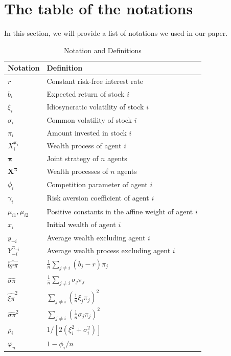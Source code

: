 \documentclass[11pt]{article}
\newenvironment{bluepar}
{\begingroup\color{blue}}
{\endgroup}
\numberwithin{equation}{section}
\renewcommand{\theequation}{\arabic{section}.\arabic{equation}}
\providecommand{\smn}{{-}} %
\begin{document}
\begin{bluepar}
\section{The table of the notations}\label{App:G}
\setcounter{equation}{0}
\renewcommand{\theequation}{G.\arabic{equation}}
In this section, we will provide a list of notations we used in our paper.
\begin{table}[htbp]
	\centering
	\caption{Notation and Definitions}
	\begin{tabular}{l l}
		\toprule
		\textbf{Notation} & \textbf{Definition} \\
		\midrule
		$r$ & Constant risk-free interest rate \\
		$b_i$ & Expected return of stock $i$ \\
		$\xi_i$ & Idiosyncratic volatility of stock $i$ \\
		$\sigma_i$ & Common volatility of stock $i$ \\
		$\pi_i$ & Amount invested in stock $i$ \\
		$X_i^{\bm{\pi}_i}$ & Wealth process of agent $i$ \\
		$\bm{\pi}$ & Joint strategy of $n$ agents \\
		$\bm{X}^{\bm{\pi}}$ & Wealth processes of $n$ agents \\
		$\phi_i$ & Competition parameter of agent $i$ \\
		$\gamma_i$ & Risk aversion coefficient of agent $i$ \\
		$\mu_{i1}, \mu_{i2}$ & Positive constants in the affine weight of agent $i$ \\
		$x_i$ & Initial wealth of agent $i$ \\
		$y_{\smn i}$ & Average wealth excluding agent $i$ \\
		$Y_{\smn i}^{\bm{\pi}_{\smn i}}$ & Average wealth process excluding agent $i$ \\
		$\widehat{\underline{br}\pi}$ & $\frac{1}{n}\sum_{j\neq i}(b_j-r)\pi_j$ \\
		$\widehat{\sigma\pi}$ & $\frac{1}{n}\sum_{j\neq i}\sigma_j\pi_j$ \\
		$\widehat{\xi\pi}^2$ & $\sum_{j\neq i}\left(\frac{1}{n}\xi_j\pi_j\right)^2$ \\
		$\widehat{\sigma\pi}^2$ & $\sum_{j\neq i}\left(\frac{1}{n}\sigma_j\pi_j\right)^2$ \\
		$\rho_i$ & $1/[2(\xi_i^2+\sigma_i^2)]$ \\
		$\varphi_n$ & $1-\phi_i/n$ \\

\end{tabular}
\end{table}
\end{bluepar}
\end{document}
